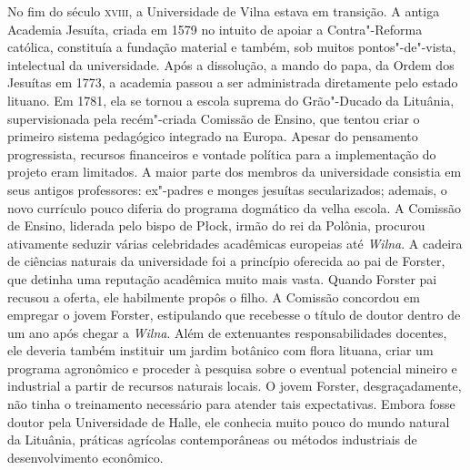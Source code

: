 \asterisc

%

No fim do século \textsc{xviii}, a Universidade de Vilna estava em transição. A
antiga Academia Jesuíta, criada em 1579 no intuito de apoiar a
Contra"-Reforma católica, constituía a fundação material e também, sob
muitos pontos"-de"-vista, intelectual da universidade. Após a dissolução,
a mando do papa, da Ordem dos Jesuítas em 1773, a academia passou a ser
administrada diretamente pelo estado lituano. Em 1781, ela se tornou a
escola suprema do Grão"-Ducado da Lituânia, supervisionada pela
recém"-criada Comissão de Ensino, que tentou criar o primeiro sistema
pedagógico integrado na Europa. Apesar do pensamento progressista,
recursos financeiros e vontade política para a implementação do projeto
eram limitados. A maior parte dos membros da universidade consistia em
seus antigos professores: ex"-padres e monges jesuítas secularizados;
ademais, o novo currículo pouco diferia do programa dogmático da velha
escola. A Comissão de Ensino, liderada pelo bispo de Płock, irmão do rei
da Polônia, procurou ativamente seduzir várias celebridades acadêmicas
europeias até \textit{Wilna}. A cadeira de ciências naturais da universidade foi
a princípio oferecida ao pai de Forster, que detinha uma reputação
acadêmica muito mais vasta. Quando Forster pai recusou a oferta, ele
habilmente propôs o filho. A Comissão concordou em empregar o jovem
Forster, estipulando que recebesse o título de doutor dentro de um ano
após chegar a \textit{Wilna}. Além de extenuantes responsabilidades docentes, ele
deveria também instituir um jardim botânico com flora lituana, criar um
programa agronômico e proceder à pesquisa sobre o eventual potencial
mineiro e industrial a partir de recursos naturais locais. O jovem
Forster, desgraçadamente, não tinha o treinamento necessário para
atender tais expectativas. Embora fosse doutor pela Universidade de
Halle, ele conhecia muito pouco do mundo natural da Lituânia, práticas
agrícolas contemporâneas ou métodos industriais de desenvolvimento
econômico.

